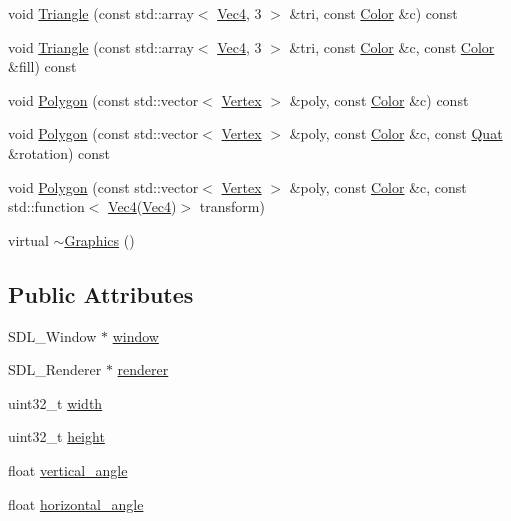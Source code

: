 \begin{DoxyCompactItemize}
void \hyperlink{class_graphics_af9079e3be00779085a52bbf305bc7d39}{Triangle} (const std\+::array$<$ \hyperlink{class_vec4}{Vec4}, 3 $>$ \&tri, const \hyperlink{class_color}{Color} \&c) const 
\item 
void \hyperlink{class_graphics_a068e87b6d102df85d523d77ff1f045c7}{Triangle} (const std\+::array$<$ \hyperlink{class_vec4}{Vec4}, 3 $>$ \&tri, const \hyperlink{class_color}{Color} \&c, const \hyperlink{class_color}{Color} \&fill) const 
\item 
void \hyperlink{class_graphics_a7248c5b72d5fc6c33cbdf42c466aa177}{Polygon} (const std\+::vector$<$ \hyperlink{class_vertex}{Vertex} $>$ \&poly, const \hyperlink{class_color}{Color} \&c) const 
\item 
void \hyperlink{class_graphics_a588b08980c14b3387db3fc2366ca6a1d}{Polygon} (const std\+::vector$<$ \hyperlink{class_vertex}{Vertex} $>$ \&poly, const \hyperlink{class_color}{Color} \&c, const \hyperlink{class_quat}{Quat} \&rotation) const 
\item 
void \hyperlink{class_graphics_a86fae61905d90d4f61159ad14b62addb}{Polygon} (const std\+::vector$<$ \hyperlink{class_vertex}{Vertex} $>$ \&poly, const \hyperlink{class_color}{Color} \&c, const std\+::function$<$ \hyperlink{class_vec4}{Vec4}(\hyperlink{class_vec4}{Vec4})$>$ transform)
\item 
virtual \hyperlink{class_graphics_a7841c9a961ac9bca33bd30ddf8066cdb}{$\sim$\+Graphics} ()
\end{DoxyCompactItemize}
\subsection*{Public Attributes}
\begin{DoxyCompactItemize}
\item 
S\+D\+L\+\_\+\+Window $\ast$ \hyperlink{class_graphics_af397f61e26b41302b0b66ee4ab408952}{window}
\item 
S\+D\+L\+\_\+\+Renderer $\ast$ \hyperlink{class_graphics_afee9119ae93eafc5707a9e868b539a2e}{renderer}
\item 
uint32\+\_\+t \hyperlink{class_graphics_ac23bbc2e5d0d3fec3a48723fd1e64036}{width}
\item 
uint32\+\_\+t \hyperlink{class_graphics_aa5c2ca96dd0ee71a689b3bd9d4542a08}{height}
\item 
float \hyperlink{class_graphics_aaba7fcf79740b3ea66199856013e66fd}{vertical\+\_\+angle}
\item 
float \hyperlink{class_graphics_a74bed00249358e126da0bc85bc7d2472}{horizontal\+\_\+angle}
\end{DoxyCompactItemize}



